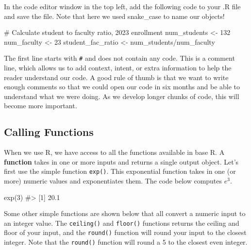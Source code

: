 \documentclass[
  letterpaper,
]{krantz}
\makeatletter
\newenvironment{Shaded}{\begin{snugshade}}{\end{snugshade}}
\newcommand{\CommentTok}[1]{\textcolor[rgb]{0.37,0.37,0.37}{#1}}
\newcommand{\DecValTok}[1]{\textcolor[rgb]{0.68,0.00,0.00}{#1}}
\newcommand{\FunctionTok}[1]{\textcolor[rgb]{0.28,0.35,0.67}{#1}}
\newcommand{\NormalTok}[1]{\textcolor[rgb]{0.00,0.23,0.31}{#1}}
\newcommand{\OtherTok}[1]{\textcolor[rgb]{0.00,0.23,0.31}{#1}}
\newcommand{\SpecialCharTok}[1]{\textcolor[rgb]{0.37,0.37,0.37}{#1}}
\newenvironment{kframe}{%
\medskip{}
\setlength{\fboxsep}{.8em}
 \def\at@end@of@kframe{}%
 \ifinner\ifhmode%
  \def\at@end@of@kframe{\end{minipage}}%
  \begin{minipage}{\columnwidth}%
 \fi\fi%
 \def\FrameCommand##1{\hskip\@totalleftmargin \hskip-\fboxsep
 \colorbox{shadecolor}{##1}\hskip-\fboxsep
     \hskip-\linewidth \hskip-\@totalleftmargin \hskip\columnwidth}%
 \MakeFramed {\advance\hsize-\width
   \@totalleftmargin\z@ \linewidth\hsize
   \@setminipage}}%
 {\par\unskip\endMakeFramed%
 \at@end@of@kframe}
\renewenvironment{Shaded}{\begin{kframe}}{\end{kframe}}
\makeatother
\begin{document}
In the code editor window in the top left, add the following code to
your .R file and save the file. Note that here we used snake\_case to
name our objects!

\begin{Shaded}
\begin{Highlighting}[]
\CommentTok{\# Calculate student to faculty ratio, 2023 enrollment}
\NormalTok{num\_students }\OtherTok{\textless{}{-}} \DecValTok{132}
\NormalTok{num\_faculty }\OtherTok{\textless{}{-}} \DecValTok{23}
\NormalTok{student\_fac\_ratio }\OtherTok{\textless{}{-}}\NormalTok{ num\_students}\SpecialCharTok{/}\NormalTok{num\_faculty}
\end{Highlighting}
\end{Shaded}

The first line starts with \texttt{\#} and does not contain any code.
This is a comment line, which allows us to add context, intent, or extra
information to help the reader understand our code. A good rule of thumb
is that we want to write enough comments so that we could open our code
in six months and be able to understand what we were doing. As we
develop longer chunks of code, this will become more important.

\hypertarget{calling-functions}{%
\subsection{Calling Functions}\label{calling-functions}}

When we use R, we have access to all the functions available in base R.
A \textbf{function} takes in one or more inputs and returns a single
output object. Let's first use the simple function \texttt{exp()}. This
exponential function takes in one (or more) numeric values and
exponentiates them. The code below computes \(e^3\).

\begin{Shaded}
\begin{Highlighting}[]
\FunctionTok{exp}\NormalTok{(}\DecValTok{3}\NormalTok{)}
\CommentTok{\#\textgreater{} [1] 20.1}
\end{Highlighting}
\end{Shaded}

Some other simple functions are shown below that all convert a numeric
input to an integer value. The \texttt{ceiling()} and \texttt{floor()}
functions returns the ceiling and floor of your input, and the
\texttt{round()} function will round your input to the closest integer.
Note that the \texttt{round()} function will round a 5 to the closest
even integer.
\end{document}
